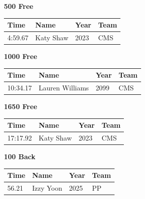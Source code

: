 \noindent\begin{minipage}[t]{0.98\textwidth}
\centering
\textbf{\textcolor{teamprimary}{500 Free}}\par
\vspace{0.5em}
\centering
\small
\renewcommand{\arraystretch}{1.0}
\setlength{\tabcolsep}{4pt}
\begin{tabular}{@{}p{2.5cm}p{4.5cm}p{1.5cm}p{2.5cm}@{}}
\toprule
\textbf{Time} & \textbf{Name} & \textbf{Year} & \textbf{Team} \\
\midrule
4:59.67 & Katy Shaw & 2023 & CMS \\
\bottomrule
\end{tabular}
\end{minipage}
\vspace{1.2em}
\noindent\begin{minipage}[t]{0.98\textwidth}
\centering
\textbf{\textcolor{teamprimary}{1000 Free}}\par
\vspace{0.5em}
\centering
\small
\renewcommand{\arraystretch}{1.0}
\setlength{\tabcolsep}{4pt}
\begin{tabular}{@{}p{2.5cm}p{4.5cm}p{1.5cm}p{2.5cm}@{}}
\toprule
\textbf{Time} & \textbf{Name} & \textbf{Year} & \textbf{Team} \\
\midrule
10:34.17 & Lauren Williams & 2099 & CMS \\
\bottomrule
\end{tabular}
\end{minipage}
\vspace{1.2em}
\noindent\begin{minipage}[t]{0.98\textwidth}
\centering
\textbf{\textcolor{teamprimary}{1650 Free}}\par
\vspace{0.5em}
\centering
\small
\renewcommand{\arraystretch}{1.0}
\setlength{\tabcolsep}{4pt}
\begin{tabular}{@{}p{2.5cm}p{4.5cm}p{1.5cm}p{2.5cm}@{}}
\toprule
\textbf{Time} & \textbf{Name} & \textbf{Year} & \textbf{Team} \\
\midrule
17:17.92 & Katy Shaw & 2023 & CMS \\
\bottomrule
\end{tabular}
\end{minipage}
\vspace{1.2em}
\noindent\begin{minipage}[t]{0.98\textwidth}
\centering
\textbf{\textcolor{teamprimary}{100 Back}}\par
\vspace{0.5em}
\centering
\small
\renewcommand{\arraystretch}{1.0}
\setlength{\tabcolsep}{4pt}
\begin{tabular}{@{}p{2.5cm}p{4.5cm}p{1.5cm}p{2.5cm}@{}}
\toprule
\textbf{Time} & \textbf{Name} & \textbf{Year} & \textbf{Team} \\
\midrule
56.21 & Izzy Yoon & 2025 & PP \\
\bottomrule
\end{tabular}
\end{minipage}
